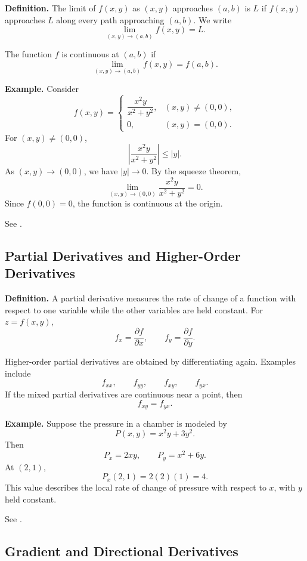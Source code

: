 \documentclass[a4paper,12pt]{article}
\theoremstyle{mystyle}
\numberwithin{equation}{section}
\numberwithin{theorem}{section}
\numberwithin{proposition}{section}
\numberwithin{example}{section}
\numberwithin{remark}{section}
\numberwithin{lemma}{section}
\numberwithin{corollary}{section}
\numberwithin{definition}{section}
\begin{document}
\textbf{Definition.}
The limit of $f(x,y)$ as $(x,y)$ approaches $(a,b)$ is $L$ if
$f(x,y)$ approaches $L$ along every path approaching $(a,b)$.
We write
\[
    \lim_{(x,y)\to(a,b)}f(x,y)=L.
\]

The function $f$ is continuous at $(a,b)$ if
\[
    \lim_{(x,y)\to(a,b)}f(x,y)=f(a,b).
\]

\textbf{Example.}
Consider
\[
    f(x,y)=
    \begin{cases}
    \dfrac{x^2y}{x^2+y^2}, & (x,y)\neq(0,0),\\[6pt]
    0, & (x,y)=(0,0).
    \end{cases}
\]
For $(x,y)\neq(0,0)$,
\[
    \left|\frac{x^2y}{x^2+y^2}\right|
    \leq |y|.
\]
As $(x,y)\to(0,0)$, we have $|y|\to0$. By the squeeze theorem,
\[
    \lim_{(x,y)\to(0,0)}
    \frac{x^2y}{x^2+y^2}=0.
\]
Since $f(0,0)=0$, the function is continuous at the origin.

See \cite[Section~4.2]{openstaxlimits}.

\subsection{Partial Derivatives and Higher-Order Derivatives}

\textbf{Definition.}
A partial derivative measures the rate of change of a function with
respect to one variable while the other variables are held constant.
For $z=f(x,y)$,
\[
    f_x=\frac{\partial f}{\partial x},
    \qquad
    f_y=\frac{\partial f}{\partial y}.
\]

Higher-order partial derivatives are obtained by differentiating
again. Examples include
\[
    f_{xx},\qquad f_{yy},\qquad f_{xy},\qquad f_{yx}.
\]
If the mixed partial derivatives are continuous near a point, then
\[
    f_{xy}=f_{yx}.
\]

\textbf{Example.}
Suppose the pressure in a chamber is modeled by
\[
    P(x,y)=x^2y+3y^2.
\]
Then
\[
    P_x=2xy,\qquad P_y=x^2+6y.
\]
At $(2,1)$,
\[
    P_x(2,1)=2(2)(1)=4.
\]
This value describes the local rate of change of pressure with respect
to $x$, with $y$ held constant.

See \cite[Section~4.3]{openstaxpartial}.

\subsection{Gradient and Directional Derivatives}
\end{document}
